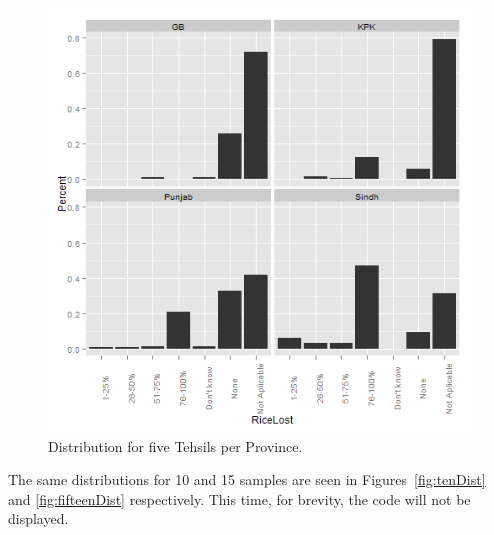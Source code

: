 \begin{figure}[!hbt]
\begin{knitrout}
\color{fgcolor}

{\centering \includegraphics[width=.9\linewidth]{smallerDist/figures/fiveDistPlot} 

}


\end{knitrout}

\caption{Distribution for five Tehsils per Province.\label{fig:fiveDist}}
\end{figure}

The same distributions for 10 and 15 samples are seen in Figures~\ref{fig:tenDist} and \ref{fig:fifteenDist} respectively.  This time, for brevity, the code will not be displayed.

